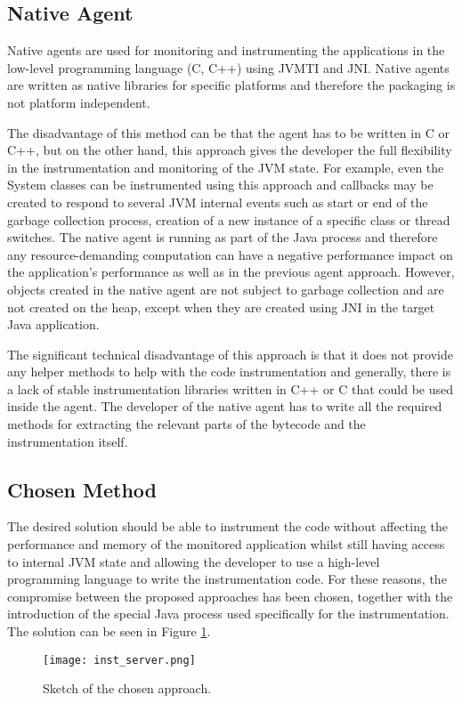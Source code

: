 \subsection{Native Agent}
Native agents are used for monitoring and instrumenting the applications in the low-level programming language (C, C++) using JVMTI and JNI. Native agents are written as native libraries for specific platforms and therefore the packaging is not platform independent. 

The disadvantage of this method can be that the agent has to be written in C or C++, but on the other hand, this approach gives the developer the full flexibility in the instrumentation and monitoring of the JVM state. For example, even the System classes can be instrumented using this approach and callbacks may be created to respond to several JVM internal events such as start or end of the garbage collection process, creation of a new instance of a specific class or thread switches. The native agent is running as part of the Java process and therefore any resource-demanding computation can have a negative performance impact on the application's performance as well as in the previous agent approach. However, objects created in the native agent are not subject to garbage collection and are not created on the heap, except when they are created using JNI in the target Java application.

The significant technical disadvantage of this approach is that it does not provide any helper methods to help with the code instrumentation and generally, there is a lack of stable instrumentation libraries written in C++ or C that could be used inside the agent. The developer of the native agent has to write all the required methods for extracting the relevant parts of the bytecode and the instrumentation itself.
\subsection{Chosen Method}
\label{subsec:inst_jvm}
The desired solution should be able to instrument the code without affecting the performance and memory of the monitored application whilst still having access to internal JVM state and allowing the developer to use a high-level programming language to write the instrumentation code. For these reasons, the compromise between the proposed approaches has been chosen, together with the introduction of the special Java process used specifically for the instrumentation. The solution can be seen in Figure \ref{fig:inst_server_basic}.
\begin{figure}
	\centering
	\texttt{[image: inst\_server.png]}
	\caption{Sketch of the chosen approach.}
	\label{fig:inst_server_basic}
\end{figure}

